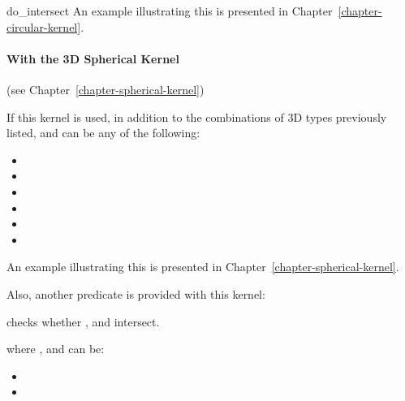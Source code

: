 \begin{ccRefFunction}{do_intersect}
An example illustrating this is presented in
Chapter~\ref{chapter-circular-kernel}.

\paragraph{With the 3D Spherical Kernel} (see Chapter~\ref{chapter-spherical-kernel}) 


If this kernel is used, in addition to the combinations of 3D types
previously listed,  and  can be any of
the following:
\begin{itemize}
\item {}
\item {}
\item {}
\item {}
\item {}
\item {}
\end{itemize}

An example illustrating this is presented in
Chapter~\ref{chapter-spherical-kernel}.

Also, another predicate is provided with this kernel:

{checks whether ,  and  intersect.}

where ,  and  can be:
\begin{itemize}
\item {}
\item {}
\end{itemize}

\ccSeeAlso
{}

\end{ccRefFunction}
